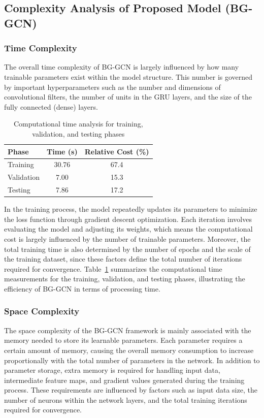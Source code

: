 \documentclass[a4paper,fleqn]{cas-sc}
\begin{document}
\subsection{Complexity Analysis of Proposed Model (BG-GCN)}\label{subsec4}

\subsubsection{Time Complexity}\label{subsubsec:time}

The overall time complexity of BG-GCN is largely influenced by how many trainable parameters exist within the model structure. This number is governed by important hyperparameters such as the number and dimensions of convolutional filters, the number of units in the GRU layers, and the size of the fully connected (dense) layers.

\begin{table}[htbp]
\caption{Computational time analysis for training, validation, and testing phases}\label{tab:t12}
\centering
\begin{tabular}{@{}lcc@{}}
\toprule
Phase & Time (s) & Relative Cost (\%) \\
\midrule
Training & 30.76 & 67.4 \\
Validation & 7.00 & 15.3 \\
Testing & 7.86 & 17.2 \\
\bottomrule
\end{tabular}
\end{table}

In the training process, the model repeatedly updates its parameters to minimize the loss function through gradient descent optimization. Each iteration involves evaluating the model and adjusting its weights, which means the computational cost is largely influenced by the number of trainable parameters. Moreover, the total training time is also determined by the number of epochs and the scale of the training dataset, since these factors define the total number of iterations required for convergence. Table~\ref{tab:t12} summarizes the computational time measurements for the training, validation, and testing phases, illustrating the efficiency of BG-GCN in terms of processing time.

\subsubsection{Space Complexity}\label{subsubsec:space}

The space complexity of the BG-GCN framework is mainly associated with the memory needed to store its learnable parameters. Each parameter requires a certain amount of memory, causing the overall memory consumption to increase proportionally with the total number of parameters in the network. In addition to parameter storage, extra memory is required for handling input data, intermediate feature maps, and gradient values generated during the training process. These requirements are influenced by factors such as input data size, the number of neurons within the network layers, and the total training iterations required for convergence.
\end{document}
